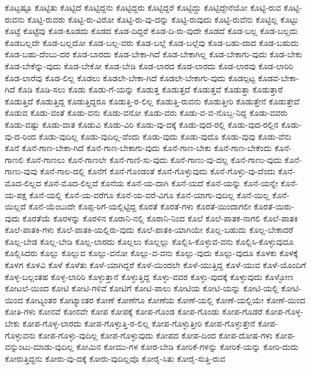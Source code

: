 {ಕೊಟ್ಟಷ್ಟೂ
ಕೊಟ್ಟಿತು
ಕೊಟ್ಟಿದೆ
ಕೊಟ್ಟಿದ್ದನು
ಕೊಟ್ಟಿದ್ದರು
ಕೊಟ್ಟಿದ್ದರೆ
ಕೊಟ್ಟಿದ್ದು
ಕೊಟ್ಟಿದ್ದೇನೆಯೋ
ಕೊಟ್ಟಿ-ರುವ
ಕೊಟ್ಟಿ-ರುವನು
ಕೊಟ್ಟಿ-ರುವರು
ಕೊಟ್ಟಿ-ರು-ವಿರೋ
ಕೊಟ್ಟಿ-ರು-ವು-ದನ್ನು
ಕೊಟ್ಟಿ-ರುವುದು
ಕೊಟ್ಟಿ-ರುವೆನು
ಕೊಟ್ಟಿಲ್ಲ
ಕೊಟ್ಟು
ಕೊಟ್ಟೆ
ಕೊಟ್ಟೆವು
ಕೊಡ-ಕೂಡದು
ಕೊಡದ
ಕೊಡ-ದಿದ್ದರೆ
ಕೊಡ-ದಿ-ರು-ವುದೇ
ಕೊಡದೆ
ಕೊಡ-ಬಲ್ಲ
ಕೊಡ-ಬಲ್ಲದು
ಕೊಡಬಲ್ಲದೇ
ಕೊಡ-ಬಲ್ಲದೋ
ಕೊಡ-ಬಲ್ಲ-ವರು
ಕೊಡ-ಬಲ್ಲೆ
ಕೊಡ-ಬಲ್ಲೆವು
ಕೊಡ-ಬಹು-ದಾದ
ಕೊಡ-ಬಹುದು
ಕೊಡ-ಬಹು-ದೆಂಬು-ದರ
ಕೊಡ-ಬಾರದು
ಕೊಡ-ಬೇಕಾ-ಗಿದೆ
ಕೊಡ-ಬೇಕಾಗಿಲ್ಲ
ಕೊಡ-ಬೇಕಾಗು-ವುದು
ಕೊಡ-ಬೇಕು
ಕೊಡ-ಬೇಕೆನ್ನು-ವುದು
ಕೊಡ-ಬೇಕೋ
ಕೊಡ-ಬೇಡಿ
ಕೊಡ-ಲಾರದ
ಕೊಡ-ಲಾರದು
ಕೊಡ-ಲಾರವು
ಕೊಡ-ಲಾರಿರಿ
ಕೊಡ-ಲಾರೆವು
ಕೊಡ-ಲಿಲ್ಲ
ಕೊಡಲು
ಕೊಡಲೇ-ಬೇಕಾ-ಗಿದೆ
ಕೊಡಲೇ-ಬೇಕಾಗು-ವುದು
ಕೊಡಲ್ಪಟ್ಟ
ಕೊಡವ-ಬೇಕಾ-ಗಿದೆ
ಕೊಡಿ
ಕೊಡಿ-ಸಲು
ಕೊಡು
ಕೊಡು-ಗೆ-ಯನ್ನು
ಕೊಡುತ್ತ
ಕೊಡುತ್ತದೆ
ಕೊಡುತ್ತವೆ
ಕೊಡುತ್ತಾ
ಕೊಡುತ್ತಾರೆ
ಕೊಡುತ್ತಿದೆ
ಕೊಡುತ್ತಿದ್ದ
ಕೊಡುತ್ತಿದ್ದರೂ
ಕೊಡುತ್ತಿ-ರ-ಲಿಲ್ಲ
ಕೊಡುತ್ತಿ-ರುವನು
ಕೊಡುತ್ತೀರಿ
ಕೊಡುತ್ತೇನೆ
ಕೊಡುತ್ತೇವೆ
ಕೊಡುವ
ಕೊಡು-ವಂತೆ
ಕೊಡು-ವನು
ಕೊಡು-ವನೋ
ಕೊಡು-ವರು
ಕೊಡು-ವ-ವ-ನೊಬ್ಬ-ನಿದ್ದ
ಕೊಡು-ವವರು
ಕೊಡು-ವಷ್ಟು
ಕೊಡು-ವಾತ
ಕೊಡುವಿ
ಕೊಡು-ವಿರಿ
ಕೊಡು-ವು-ದಕ್ಕೆ
ಕೊಡು-ವುದ-ರಲ್ಲಿ
ಕೊಡು-ವುದ-ರಲ್ಲಿನ
ಕೊಡು-ವು-ದ-ರಿಂದ
ಕೊಡು-ವುದಿಲ್ಲ
ಕೊಡು-ವುದಿಲ್ಲ-ವೆಂದು
ಕೊಡು-ವುದು
ಕೊಡು-ವುದೊ
ಕೊಡು-ವುವು
ಕೊಡು-ವೆನು
ಕೊನೆ
ಕೊನೆ-ಗಾಣ-ಬೇಕಾ-ಗಿದೆ
ಕೊನೆ-ಗಾಣ-ಬೇಕಾಗು-ವುದು
ಕೊನೆ-ಗಾಣ-ಬೇಕು
ಕೊನೆ-ಗಾಣ-ಬೇಕೆಂದು
ಕೊನೆ-ಗಾಣಲಿ
ಕೊನೆ-ಗಾಣಲು
ಕೊನೆ-ಗಾಣಲೇ
ಕೊನೆ-ಗಾಣಿ-ಸು-ವುದು
ಕೊನೆ-ಗಾಣು-ವು-ದಲ್ಲ
ಕೊನೆ-ಗಾಣು-ವುದು
ಕೊನೆ-ಗಾಣು-ವುವು
ಕೊನೆ-ಗಾಲ-ದಲ್ಲಿ
ಕೊನೆಗೆ
ಕೊನೆ-ಗೊಂಡಂತೆ
ಕೊನೆ-ಗೊಳ್ಳುವುದು
ಕೊನೆ-ಗೊಳ್ಳು-ವು-ದೆಂದು
ಕೊನೆ-ಮೊದ-ಲಿಲ್ಲದ
ಕೊನೆ-ಮೊದ-ಲಿಲ್ಲದೆ
ಕೊನೆಯ
ಕೊನೆ-ಯ-ದಾಗಿ
ಕೊನೆ-ಯದೆ
ಕೊನೆ-ಯನ್ನು
ಕೊನೆ-ಯನ್ನೇ
ಕೊನೆ-ಯ-ಪಕ್ಷ
ಕೊನೆ-ಯಲ್ಲಿ
ಕೊನೆ-ಯ-ವರೆಗೂ
ಕೊನೆ-ಯ-ವರೆ-ವಿಗೂ
ಕೊನೆ-ಯಾಗು-ವುದಿಲ್ಲ
ಕೊನೆ-ಯಿಲ್ಲ
ಕೊನೆ-ಯಿಲ್ಲದೆ
ಕೊನೆ-ಯೆಂಬುದೇ
ಕೊಪ್ಪ-ರಿಗೆ-ಯಲ್ಲಿಟ್ಟಿದ್ದ
ಕೊರತೆ
ಕೊರತೆ-ಗಳು
ಕೊರತೆ-ಯಿಂದಾಗಲೀ
ಕೊರತೆ-ಯಿರು-ವುದು
ಕೊರತೆಯೆ
ಕೊರಳನ್ನು
ಕೊರಳಿನ
ಕೊರಾನಿ-ನಲ್ಲಿ
ಕೊರಾನಿ-ನಿಂದ
ಕೊಲೆ
ಕೊಲೆ-ಪಾತಕ-ನಾಗಲಿ
ಕೊಲೆ-ಪಾತಕಿ
ಕೊಲೆ-ಪಾತಕಿ-ಗಳು
ಕೊಲೆ-ಪಾತಕಿ-ಯಲ್ಲಿರು-ವುದು
ಕೊಲೆ-ಪಾತಕಿ-ಯಾಗಿಯೇ
ಕೊಲ್ಲ-ಬಹುದು
ಕೊಲ್ಲ-ಬೇಕಾದರೆ
ಕೊಲ್ಲ-ಬೇಡ
ಕೊಲ್ಲ-ಬೇಡಿ
ಕೊಲ್ಲ-ಲಾರದು
ಕೊಲ್ಲಲು
ಕೊಲ್ಲಲ್ಲು
ಕೊಲ್ಲಿಸಿ-ಕೊಳ್ಳುವ-ವನು
ಕೊಲ್ಲಿಸಿ-ಕೊಳ್ಳುವುದೂ
ಕೊಲ್ಲಿಸಿದರು
ಕೊಲ್ಲು
ಕೊಲ್ಲುವ
ಕೊಲ್ಲು-ವನೋ
ಕೊಲ್ಲು-ವ-ವನು
ಕೊಲ್ಲು-ವುದು
ಕೊಲ್ಲು-ವುದೂ
ಕೊಳಕು
ಕೊಳಕ್ಕೆ
ಕೊಳಗ
ಕೊಳವಿ
ಕೊಳೆ
ಕೊಳೆತು
ಕೊಳೆ-ಯಾಗಿದ್ದರೆ
ಕೊಳೆ-ಯಿಂದಲೇ
ಕೊಳೆ-ಯುತ್ತಿದ್ದ
ಕೊಳೆ-ಯುವ
ಕೊಳೆ-ಯೊಂದಿಗೆ
ಕೊಳ್ಳ-ಬಲ್ಲಂತಹ
ಕೊಳ್ಳ-ಲಾರಿರಿ
ಕೊಳ್ಳುತ್ತಾನೆ
ಕೊಳ್ಳುತ್ತಿದ್ದ
ಕೊಳ್ಳು-ವವರ
ಕೊಳ್ಳು-ವುದಕ್ಕೆ
ಕೊಳ್ಳುವುದು
ಕೊಳ್ಳೋಣ
ಕೋಟಲೆ-ಯಿಂದ
ಕೋಟಿ
ಕೋಟಿ-ಗಳಿವೆ
ಕೋಟಿಗೆ
ಕೋಟಿ-ಪಾಲು
ಕೋಟಿಯ
ಕೋಟಿ-ಯನ್ನು
ಕೋಟಿ-ಯಲ್ಲಿ
ಕೋಟಿ-ಯಿಂದ
ಕೋಟ್ಯಂತರ
ಕೋಟ್ಯಾಂತರ
ಕೋಣೆ
ಕೋಣೆಗೂ
ಕೋಣೆಯ
ಕೋಣೆ-ಯಲ್ಲಿ
ಕೋಣೆ-ಯಲ್ಲಿಯೇ
ಕೋಣೆ-ಯಿಂದ
ಕೋತಿ-ಗಳು
ಕೋನವೆ
ಕೋನವೇ
ಕೋಪ
ಕೋಪಕ್ಕೆ
ಕೋಪ-ಗೊಂಡ
ಕೋಪ-ಗೊಂಡು
ಕೋಪ-ಗೊಡರೆ
ಕೋಪ-ಗೊಳ್ಳ-ಬೇಕು
ಕೋಪ-ಗೊಳ್ಳ-ಲಾರದು
ಕೋಪ-ಗೊಳ್ಳುತ್ತಿ-ರ-ಲಿಲ್ಲ
ಕೋಪ-ಗೊಳ್ಳುತ್ತೀರಿ
ಕೋಪ-ಗೊಳ್ಳುತ್ತೇನೆ
ಕೋಪ-ಗೊಳ್ಳುವನು
ಕೋಪ-ಗೊಳ್ಳು-ವುದಿಲ್ಲ
ಕೋಪ-ಗೊಳ್ಳುವುದು
ಕೋಪದ
ಕೋಪ-ದಿಂದ
ಕೋಪ-ದೋಷ-ಗಳು
ಕೋಪ-ವನ್ನುಂಟು-ಮಾಡು-ವುದಿಲ್ಲ
ಕೋಮಿನ
ಕೋಮು-ಗಳ
ಕೋರ-ಬೇಡಿ
ಕೋರಿಕೆ-ಗಳನ್ನು
ಕೋರಿಕೆ-ಯನ್ನು
ಕೋರಿ-ದುದು
ಕೋರುತ್ತಿದ್ದನು
ಕೋರು-ವು-ದಕ್ಕೆ
ಕೋರು-ವುದಿಲ್ಲವೊ
ಕೋರೈ-ಸಿತು
ಕೋರೈ-ಸುತ್ತಿ-ರುವ
}
